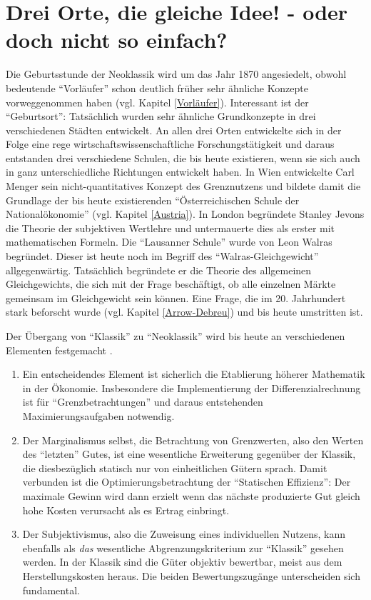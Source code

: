 %
%
%

\chapter{Drei Orte, die gleiche Idee! - oder doch nicht so einfach?}
\label{Marginalismus}

Die Geburtsstunde der Neoklassik wird um das Jahr 1870 angesiedelt, obwohl bedeutende "`Vorläufer"' schon deutlich früher sehr ähnliche Konzepte vorweggenommen haben (vgl. Kapitel \ref{Vorläufer}). Interessant ist der "`Geburtsort"': Tatsächlich wurden sehr ähnliche Grundkonzepte in drei verschiedenen Städten entwickelt. An allen drei Orten entwickelte sich in der Folge eine rege wirtschaftswissenschaftliche Forschungstätigkeit und daraus entstanden drei verschiedene Schulen, die bis heute existieren, wenn sie sich auch in ganz unterschiedliche Richtungen entwickelt haben. In Wien entwickelte Carl Menger sein nicht-quantitatives Konzept des Grenznutzens und bildete damit die Grundlage der bis heute existierenden "`Österreichischen Schule der Nationalökonomie"' (vgl. Kapitel \ref{Austria}). In London begründete Stanley Jevons die Theorie der subjektiven Wertlehre und untermauerte dies als erster mit mathematischen Formeln. Die "`Lausanner Schule"' wurde von Leon Walras begründet. Dieser ist heute noch im Begriff des "`Walras-Gleichgewicht"' allgegenwärtig. Tatsächlich begründete er die Theorie des allgemeinen Gleichgewichts, die sich mit der Frage beschäftigt, ob alle einzelnen Märkte gemeinsam im Gleichgewicht sein können. Eine Frage, die im 20. Jahrhundert stark beforscht wurde (vgl. Kapitel \ref{Arrow-Debreu}) und bis heute umstritten ist.

Der Übergang von "`Klassik"' zu "`Neoklassik"' wird bis heute an verschiedenen Elementen festgemacht \parencite[S. 198]{Ekelund2002}.
\begin{enumerate}
	\item Ein entscheidendes Element ist sicherlich die Etablierung höherer Mathematik in der Ökonomie. Insbesondere die Implementierung der Differenzialrechnung ist für "`Grenzbetrachtungen"' und daraus entstehenden Maximierungsaufgaben notwendig.
	\item Der Marginalismus selbst, die Betrachtung von Grenzwerten, also den Werten des "`letzten"' Gutes, ist eine wesentliche Erweiterung gegenüber der Klassik, die diesbezüglich statisch nur von einheitlichen Gütern sprach. Damit verbunden ist die Optimierungsbetrachtung der "`Statischen Effizienz"': Der maximale Gewinn wird dann erzielt wenn das nächste produzierte Gut gleich hohe Kosten verursacht als es Ertrag einbringt. 
	\item Der Subjektivismus, also die Zuweisung eines individuellen Nutzens, kann ebenfalls als \textit{das} wesentliche Abgrenzungskriterium zur "`Klassik"' gesehen werden. In der Klassik sind die Güter objektiv bewertbar, meist aus dem Herstellungskosten heraus. Die beiden Bewertungszugänge unterscheiden sich fundamental.
\end{enumerate}

